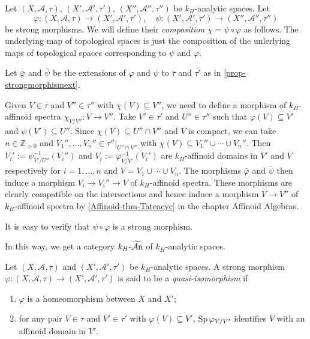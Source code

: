 \begin{definition}\label{def-strongmorphismcompo}
    Let $(X,\mathcal{A},\tau)$, $(X',\mathcal{A}',\tau')$, $(X'',\mathcal{A}'',\tau'')$ be $k_H$-analytic spaces. Let 
    \[
        \varphi:  (X,\mathcal{A},\tau)\rightarrow (X',\mathcal{A}',\tau'),\quad \psi: (X',\mathcal{A}',\tau')\rightarrow (X'',\mathcal{A}'',\tau'')
    \]
    be strong morphisms. We will define their \emph{composition} $\chi=\psi\circ \varphi$ as follows. The underlying map of topological spaces is just the composition of the unlerlying maps of topological spaces corresponding to $\psi$ and $\varphi$.
    
    Let $\bar{\varphi}$ and $\bar{\psi}$ be the extensions of  $\varphi$ and $\psi$ to $\bar{\tau}$ and $\overline{\tau'}$ as in \cref{prop-strongmorphismext}. 
    
    Given $V\in \tau$ and $V''\in \tau''$ with $\chi(V)\subseteq V''$, we need to define a morphism of $k_H$-affinoid spectra $\chi_{V/V''}:V\rightarrow V''$. Take $V'\in \tau'$ and $U''\in \tau''$ such that $\varphi(V)\subseteq V'$ and $\psi(V')\subseteq U''$. Since $\chi(V)\subseteq U''\cap V''$ and $V$ is compact, we can take $n\in \mathbb{Z}_{>0}$ and $V_1'',\ldots,V_n''\in \tau''|_{U''\cap V''}$ with $\chi(V)\subseteq V_1''\cup\cdots\cup V_n''$. Then $V_i':=\psi^{-1}_{V'/U''}(V_i'')$ and $V_i:=\varphi_{V/V'}^{-1}(V_i')$ are $k_H$-affinoid domains in $V'$ and $V$ respectively for $i=1,\ldots,n$ and $V=V_1\cup\cdots\cup V_n$. The morphisms $\bar{\varphi}$ and $\bar{\psi}$ then induce a morphism $V_i\rightarrow V_i''\rightarrow V$ of $k_H$-affinoid spectra. These morphisms are clearly compatible on the intersections and hence induce a morphism $V\rightarrow V''$ of $k_H$-affinoid spectra by \cref{Affinoid-thm-Tateacyc} in the chapter Affinoid Algebras.

    It is easy to verify that $\psi\circ \varphi$ is a strong morphism.

    In this way, we get a category $k_H\text{-}\widetilde{\mathcal{A}\mathrm{n}}$ of $k_H$-analytic spaces. 
\end{definition}

\begin{definition}
    Let $(X,\mathcal{A},\tau)$ and $(X',\mathcal{A}',\tau')$ be $k_H$-analytic spaces. A strong morphism $\varphi:(X,\mathcal{A},\tau)\rightarrow (X',\mathcal{A}',\tau')$ is said to be a \emph{quasi-isomorphism} if 
    \begin{enumerate}
        \item $\varphi$ is a homeomorphism between $X$ and $X'$;
        \item for any pair $V\in \tau$ and $V'\in \tau'$ with $\varphi(V)\subseteq V'$, $\operatorname{Sp} \varphi_{V/V'}$ identifies $V$ with an affinoid domain in $V'$.
    \end{enumerate}
\end{definition}

